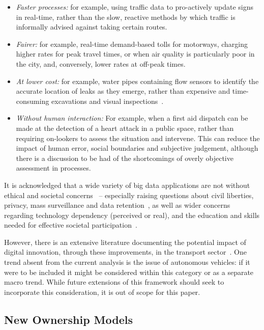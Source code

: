 \documentclass[b5paper,10pt]{article}
\begin{document}
\begin{itemize}
\item {\emph{Faster processes:}} for example, using traffic data to
pro-actively update signs in real-time, rather than the slow, reactive
methods by which traffic is informally advised against taking certain
routes.
\item {\emph{Fairer:}} for example, real-time demand-based tolls for
motorways, charging higher rates for peak travel times, or when air
quality is particularly poor in the city, and, conversely, lower rates
at off-peak times.
\item {\emph{At lower cost:}} for example, water pipes containing flow
sensors to identify the accurate location of leaks as they emerge,
rather than expensive and time-consuming excavations and visual
inspections~\citep{cosgrave-et-al:2014}.
\item {\emph{Without human interaction:}} For example, when a first
aid dispatch can be made at the detection of a heart attack in a
public space, rather than requiring on-lookers to assess the situation
and intervene. This can reduce the impact of human error, social
boundaries and subjective judgement, although there is a discussion to
be had of the shortcomings of overly objective assessment in
processes.
\end{itemize}

It is acknowledged that a wide variety of big data applications are
not without ethical and societal
concerns~\citep{bimber:1990,metcalf-et-al:2016} -- especially raising
questions about civil liberties, privacy, mass surveillance and data
retention~\citep{goold:2002,oatley-et-al_dasc:2015,tryfonas-etal-has2016},
as well as wider concerns regarding technology dependency (perceived
or real), and the education and skills needed for effective societal
participation~\citep{brown-et-al-toce2014,tryfonas+crick:petra2018}.

However, there is an extensive literature documenting the potential
impact of digital innovation, through these improvements, in the
transport sector~\citep{enoch:2015}. One trend absent from the current
analysis is the issue of autonomous vehicles: if it were to be
included it might be considered within this category or as a separate
macro trend. While future extensions of this framework should seek to
incorporate this consideration, it is out of scope for this paper.

\subsection{New Ownership Models}
\end{document}

